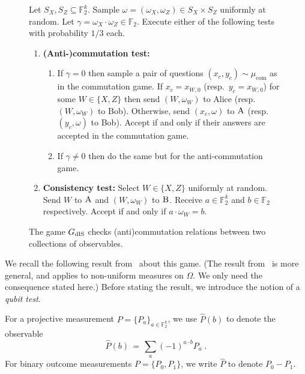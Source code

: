 \documentclass[11pt]{article}
\theoremstyle{definition}
\newcommand{\field}{\mathbb{F}_2}
\newcommand{\dlS}{\ensuremath{\rm dlS}}
\newcommand{\F}{\ensuremath{\mathbb{F}}}
\newcommand{\cc}{\mathrm{com}}
\newcommand{\labelstyle}[1]{\ensuremath{\textsc{#1}}\xspace}
\newcommand{\alice}{\labelstyle{A}}
\newcommand{\bob}{\labelstyle{B}}
\newenvironment{gamespec}{
  \begin{mdframed}[style=figstyle]}{
  \end{mdframed}}
\begin{document}
\begin{figure}[!htbp]
  \centering
  \begin{gamespec}
Let $S_X,S_Z\subseteq \field^k$.  Sample $\omega = (\omega_X,\omega_Z)\in S_X \times S_Z $ uniformly at random. Let $\gamma = \omega_X \cdot \omega_Z \in \field$. Execute either of the following tests with probability $1/3$ each. 
    \begin{enumerate}
      \setlength\itemsep{1pt}
    \item \textbf{(Anti-)commutation test:} 
		\begin{enumerate}
		\item If $\gamma=0$ then sample a pair of questions $(x_c,y_c)\sim\mu_\cc$ as in the commutation game. If $x_c = x_{W,0}$ (resp.\ $y_c=x_{W,0}$) for some $W\in \{X,Z\}$ then send $(W,\omega_W)$ to Alice (resp.\ $(W,\omega_W)$ to Bob). Otherwise, send $(x_c,\omega)$ to $\alice$ (resp.\ $(y_c,\omega)$ to Bob). Accept if and only if their answers are accepted in the commutation game. 
		\item If $\gamma\neq 0$ then do the same but for the anti-commutation game. 
		\end{enumerate} 
		 \item \textbf{Consistency test:} Select $W\in\{X,Z\}$ uniformly at random. Send $W$ to $\alice$ and $(W,\omega_W)$ to $\bob$. Receive $a\in \field^k$ and $b\in \field$ respectively. Accept if and only if $a\cdot \omega_W=b$. 
    \end{enumerate}
  \end{gamespec}
  \caption{The game $G_{\dlS}$ checks (anti)commutation relations between two collections of observables.}
  \label{fig:dlS}
\end{figure}

We recall the following result from~\cite{de2022spectral} about this game. (The result from~\cite{de2022spectral} is more general, and applies to non-uniform measures on $\Omega$. We only need the consequence stated here.) Before stating the result, we introduce the notion of a \emph{qubit test}. 

For a projective measurement $P = \{P_a\}_{a \in \F_2^k}$, we use $\widehat{P}(b)$ to denote the observable
\[\widehat{P}(b) \,=\, \sum_a (-1)^{a\cdot b} P_a\;.\]
For binary outcome measurements $P = \{ P_0, P_1\}$, we write $\widehat{P}$ to denote $P_0 - P_1$. 
\end{document}
